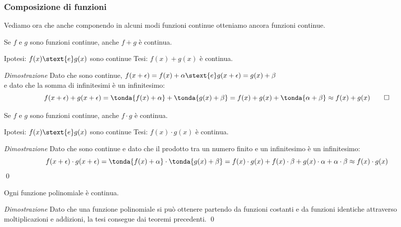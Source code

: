 \subsubsection{Composizione di funzioni}
\label{subsubsec:cont_composizionefunzioni}

Vediamo ora che anche componendo in alcuni modi funzioni continue otteniamo 
ancora funzioni continue.

\begin{teorema}
Se \(f\) e \(g\) sono funzioni continue, anche \(f+g\) è continua.
\end{teorema}

\noindent Ipotesi: 
\(f(x) \stext{e} g(x)\) sono continue
\tab Tesi: 
\(f(x)+g(x)\) è continua.

\emph{Dimostrazione}
Dato che sono continue, 
\(f(x+\epsilon) = f(x)+\alpha \stext{ e } g(x+\epsilon) = g(x)+\beta\) \\
e dato che la somma di infinitesimi è un infinitesimo:
\[f(x+\epsilon) + g(x+\epsilon) = 
\tonda{f(x)+\alpha} + \tonda{g(x)+\beta} = 
f(x)+g(x)+\tonda{\alpha + \beta} \approx f(x)+g(x) \qed\]

\begin{teorema}
Se \(f\) e \(g\) sono funzioni continue, anche \(f \cdot g\) è continua.
\end{teorema}

\noindent Ipotesi: 
\(f(x) \stext{e} g(x)\) sono continue
\tab Tesi: 
\(f(x) \cdot g(x)\) è continua.

\emph{Dimostrazione}
Dato che sono continue e dato che il prodotto tra un numero finito e un 
infinitesimo è un infinitesimo: 
\[f(x+\epsilon) \cdot g(x+\epsilon) = 
\tonda{f(x)+\alpha} \cdot \tonda{g(x)+\beta} = 
f(x) \cdot g(x) + f(x) \cdot \beta + g(x) \cdot \alpha + \alpha \cdot \beta
\approx f(x) \cdot g(x)\]
\qed

\begin{corollario}
 Ogni funzione polinomiale è continua.
\end{corollario}

\emph{Dimostrazione}
Dato che una funzione polinomiale si può ottenere partendo da funzioni 
costanti e da funzioni identiche attraverso moltiplicazioni e addizioni, 
la tesi consegue dai teoremi precedenti. \qed

